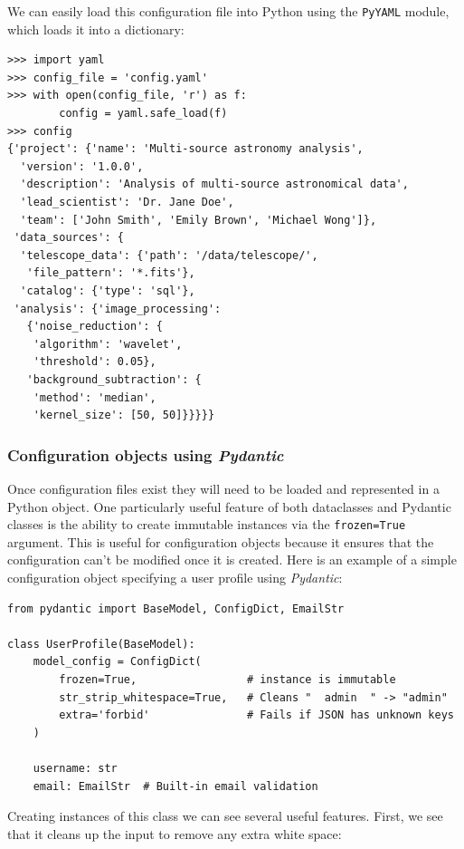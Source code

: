 We can easily load this configuration file into Python using the \texttt{PyYAML} module, which loads it into a dictionary:

\begin{lstlisting}[style=repl]
>>> import yaml
>>> config_file = 'config.yaml'
>>> with open(config_file, 'r') as f:
        config = yaml.safe_load(f)
>>> config
{'project': {'name': 'Multi-source astronomy analysis',
  'version': '1.0.0',
  'description': 'Analysis of multi-source astronomical data',
  'lead_scientist': 'Dr. Jane Doe',
  'team': ['John Smith', 'Emily Brown', 'Michael Wong']},
 'data_sources': {
  'telescope_data': {'path': '/data/telescope/',
   'file_pattern': '*.fits'},
  'catalog': {'type': 'sql'},
 'analysis': {'image_processing': 
   {'noise_reduction': {
    'algorithm': 'wavelet',
    'threshold': 0.05},
   'background_subtraction': {
    'method': 'median', 
    'kernel_size': [50, 50]}}}}}
\end{lstlisting}


\subsubsection{Configuration objects using \textit{Pydantic}}

Once configuration files exist they will need to be loaded and represented in a Python object. One particularly useful feature of both dataclasses and Pydantic classes is the ability to create immutable instances via the \texttt{frozen=True} argument.  This is useful for configuration objects because it ensures that the configuration can't be modified once it is created.  Here is an example of a simple configuration object specifying a user profile using \textit{Pydantic}:

\begin{lstlisting}[style=Python]
from pydantic import BaseModel, ConfigDict, EmailStr

class UserProfile(BaseModel):
    model_config = ConfigDict(
        frozen=True,                 # instance is immutable 
        str_strip_whitespace=True,   # Cleans "  admin  " -> "admin"
        extra='forbid'               # Fails if JSON has unknown keys
    )
    
    username: str
    email: EmailStr  # Built-in email validation
\end{lstlisting}

Creating instances of this class we can see several useful features.  First, we see that it cleans up the input to remove any extra white space:

